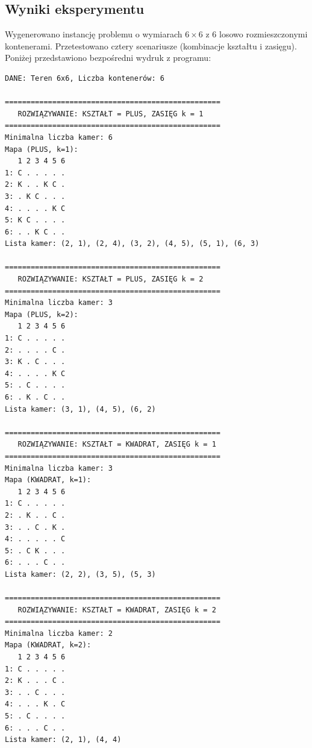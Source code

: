 \documentclass[11pt, a4paper]{article}
\begin{document}
\subsection{Wyniki eksperymentu}
Wygenerowano instancję problemu o wymiarach $6 \times 6$ z 6 losowo rozmieszczonymi kontenerami. Przetestowano cztery scenariusze (kombinacje kształtu i zasięgu). Poniżej przedstawiono bezpośredni wydruk z programu:

\bigskip
\noindent
\begin{minipage}{\linewidth}
\begin{verbatim}
DANE: Teren 6x6, Liczba kontenerów: 6

==================================================
   ROZWIĄZYWANIE: KSZTAŁT = PLUS, ZASIĘG k = 1
==================================================
Minimalna liczba kamer: 6
Mapa (PLUS, k=1):
   1 2 3 4 5 6
1: C . . . . . 
2: K . . K C .
3: . K C . . .
4: . . . . K C
5: K C . . . .
6: . . K C . .
Lista kamer: (2, 1), (2, 4), (3, 2), (4, 5), (5, 1), (6, 3)

==================================================
   ROZWIĄZYWANIE: KSZTAŁT = PLUS, ZASIĘG k = 2
==================================================
Minimalna liczba kamer: 3
Mapa (PLUS, k=2):
   1 2 3 4 5 6
1: C . . . . .
2: . . . . C .
3: K . C . . .
4: . . . . K C
5: . C . . . .
6: . K . C . .
Lista kamer: (3, 1), (4, 5), (6, 2)

==================================================
   ROZWIĄZYWANIE: KSZTAŁT = KWADRAT, ZASIĘG k = 1
==================================================
Minimalna liczba kamer: 3
Mapa (KWADRAT, k=1):
   1 2 3 4 5 6
1: C . . . . .
2: . K . . C .
3: . . C . K .
4: . . . . . C
5: . C K . . .
6: . . . C . .
Lista kamer: (2, 2), (3, 5), (5, 3)

==================================================
   ROZWIĄZYWANIE: KSZTAŁT = KWADRAT, ZASIĘG k = 2
==================================================
Minimalna liczba kamer: 2
Mapa (KWADRAT, k=2):
   1 2 3 4 5 6
1: C . . . . .
2: K . . . C .
3: . . C . . .
4: . . . K . C
5: . C . . . .
6: . . . C . .
Lista kamer: (2, 1), (4, 4)
\end{verbatim}
\end{minipage}
\end{document}
